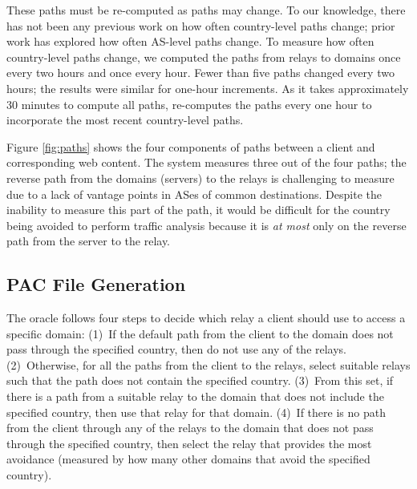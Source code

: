 These paths must be re-computed 
as paths may change.  To our knowledge, there has not been any previous work 
on how often country-level paths change; prior work has explored how often 
AS-level paths change.  To measure how often country-level paths change, we 
computed the paths from relays to domains once every two hours and once every 
hour.  Fewer than five paths changed every two hours; the 
results were similar for one-hour increments.  As it takes approximately 30 minutes to 
compute all paths, \system{} re-computes the paths every one hour to incorporate 
the most recent country-level paths.


Figure \ref{fig:paths} shows the four components of paths between a
client and corresponding web content.  The system measures three 
out of the four paths; the reverse path from the domains (servers) to the relays 
is challenging to measure due to a lack of vantage points in ASes of
common destinations.  Despite the inability to measure this part of the
path, it would be difficult for the country being avoided to perform
traffic analysis because it is {\it at most} only on the reverse path 
from the server to the relay. 

\subsection{PAC File Generation}
\label{multiplex}
The oracle follows four steps to decide which relay a client should
use to access a specific domain: (1)~If the default path from the
client to the domain does not pass through the specified country, then
do not use any of the relays.  (2)~Otherwise, for all the paths from
the client to the relays, select suitable relays such that the path
does not contain the specified country.  (3)~From this set, if there
is a path from a suitable relay to the domain that does not include
the specified country, then use that relay for that domain.  (4)~If
there is no path from the client through any of the relays to the
domain that does not pass through the specified country, then select
the relay that provides the most avoidance (measured by how many other
domains that avoid the specified country).

